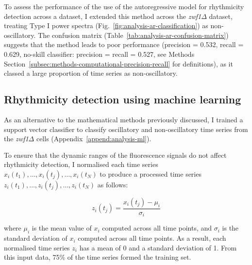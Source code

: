 To assess the performance of the use of the autoregressive model for rhythmicity detection across a dataset, I extended this method across the \textit{zwf1$\Delta$} dataset, treating Type I power spectra (Fig.\ \ref{fig:analysis-ar-classification}) as non-oscillatory.
The confusion matrix (Table~\ref{tab:analysis-ar-confusion-matrix}) suggests that the method leads to poor performance (precision = 0.532, recall = 0.629, no-skill classifier: precision = recall = 0.527, see Methods Section~\ref{subsec:methods-computational-precision-recall} for definitions), as it classed a large proportion of time series as non-oscillatory.


\subsection{Rhythmicity detection using machine learning}
\label{subsec:analysis-classification-ml}

As an alternative to the mathematical methods previously discussed, I trained a support vector classifier to classify oscillatory and non-oscillatory time series from the \textit{zwf1$\Delta$} cells (Appendix~\ref{append:analysis-ml}).

To ensure that the dynamic ranges of the fluorescence signals do not affect rhythmicity detection, I normalised each time series $x_{i}(t_{1}), \ldots , x_{i}(t_{j}), \ldots , x_{i}(t_{N})$ to produce a processed time series $z_{i}(t_{1}), \ldots , z_{i}(t_{j}), \ldots , z_{i}(t_{N})$ as follows:

\begin{equation}
  z_{i}(t_{j}) = \frac{x_{i}(t_{j}) - \mu_{i}}{\sigma_{i}}
  \label{eq:analysis-stdscore}
\end{equation}

where $\mu_{i}$ is the mean value of $x_{i}$ computed across all time points, and $\sigma_{i}$ is the standard deviation of $x_{i}$ computed across all time points.
As a result, each normalised time series $z_{i}$ has a mean of 0 and a standard deviation of 1.
From this input data, 75\% of the time series formed the training set.

